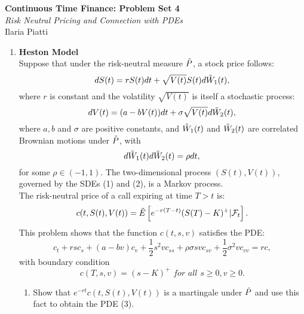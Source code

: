 \documentclass[11pt,a4,table]{article}
\begin{document}
\vspace*{-0.7in}

\begin{center}
 \textbf{Continuous Time Finance: Problem Set 4} \\
 \textit{Risk Neutral Pricing and Connection with PDEs } \\
Ilaria Piatti
\end{center} 


\begin{enumerate}
    \item \textbf{Heston Model} \\
    Suppose that under the risk-neutral measure $\Tilde{P}$, a stock price follows:
    \begin{equation}
        dS(t) = rS(t) dt + \sqrt{V(t)} S(t) d\Tilde{W}_1(t),
    \end{equation}
    where $r$ is constant and the volatility $\sqrt{V(t)}$ is itself a stochastic process:
    \begin{equation}
        dV(t) = (a - bV(t)) dt + \sigma \sqrt{V(t)} d\Tilde{W}_2(t),
    \end{equation}
    where $a,b$ and $\sigma$ are positive constants, and $\Tilde{W}_1(t)$ and $\Tilde{W}_2(t)$ are correlated Brownian motions under $\Tilde{P}$, with
    \begin{equation*}
        d\Tilde{W}_1(t) d\Tilde{W}_2(t) = \rho dt,
    \end{equation*}
    for some $\rho\in(-1,1)$. The two-dimensional process $(S(t), V(t))$, governed by the SDEs (1) and (2), is a Markov process.\\
    The risk-neutral price of a call expiring at time $T>t$ is:
    \begin{equation*}
        c(t,S(t), V(t)) = \Tilde{E}\left[e^{-r(T-t)}(S(T)-K)^+|\mathcal{F}_t\right].
    \end{equation*}
    This problem shows that the function $c(t,s,v)$ satisfies the PDE:
    \begin{equation}
        c_t + rsc_s + (a-bv)c_v + \frac{1}{2}s^2 vc_{ss} + \rho \sigma svc_{sv} + \frac{1}{2}\sigma^2 vc_{vv} = rc,
    \end{equation}
    with boundary condition
    \begin{equation}
        c(T,s,v) = (s-K)^+ \textit{ for all } s\geq 0, v\geq 0. 
    \end{equation}
    
    \begin{enumerate}
        \item Show that $e^{-rt}c(t,S(t),V(t))$ is a martingale under $\Tilde{P}$ and use this fact to obtain the PDE (3).
    

\end{enumerate}
\end{enumerate}
\end{document}
